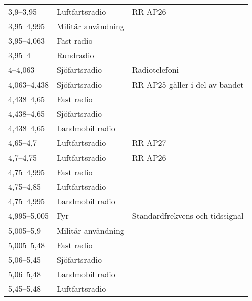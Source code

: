 \begin{landscape}
\begin{longtable}{lll}
3,9--3,95         & Luftfartsradio                   & RR AP26                         \\
3,95--4,995       & Militär användning               &                                 \\
3,95--4,063       & Fast radio                       &                                 \\	 
3,95--4           & Rundradio                        &                                 \\
4--4,063          & Sjöfartsradio                    & Radiotelefoni                   \\
4,063--4,438      & Sjöfartsradio                    & RR AP25 gäller i del av bandet  \\
4,438--4,65       & Fast radio                       &                                 \\
4,438--4,65       & Sjöfartsradio                    &                                 \\
4,438--4,65       & Landmobil radio                  &                                 \\
4,65--4,7         & Luftfartsradio                   & RR AP27                         \\
4,7--4,75         & Luftfartsradio                   & RR AP26                         \\
4,75--4,995       & Fast radio                       &                                 \\
4,75--4,85        & Luftfartsradio                   &                                 \\
4,75--4,995       & Landmobil radio                  &                                 \\
4,995--5,005      & Fyr                              & Standardfrekvens och tidssignal \\
5,005--5,9        & Militär användning               &                                 \\
5,005--5,48       & Fast radio                       &                                 \\
5,06--5,45        & Sjöfartsradio                    &                                 \\
5,06--5,48        & Landmobil radio                  &                                 \\
5,45--5,48        & Luftfartsradio                   &                                 \\

\end{longtable}
\end{landscape}
